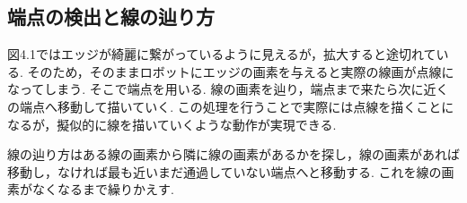	\subsection{端点の検出と線の辿り方}
	\label{chap:end points detection}
	図4.1ではエッジが綺麗に繋がっているように見えるが，拡大すると途切れている. そのため，そのままロボットにエッジの画素を与えると実際の線画が点線になってしまう. そこで端点を用いる. 線の画素を辿り，端点まで来たら次に近くの端点へ移動して描いていく. 
	この処理を行うことで実際には点線を描くことになるが，擬似的に線を描いていくような動作が実現できる.

	線の辿り方はある線の画素から隣に線の画素があるかを探し，線の画素があれば移動し，なければ最も近いまだ通過していない端点へと移動する. これを線の画素がなくなるまで繰りかえす.

